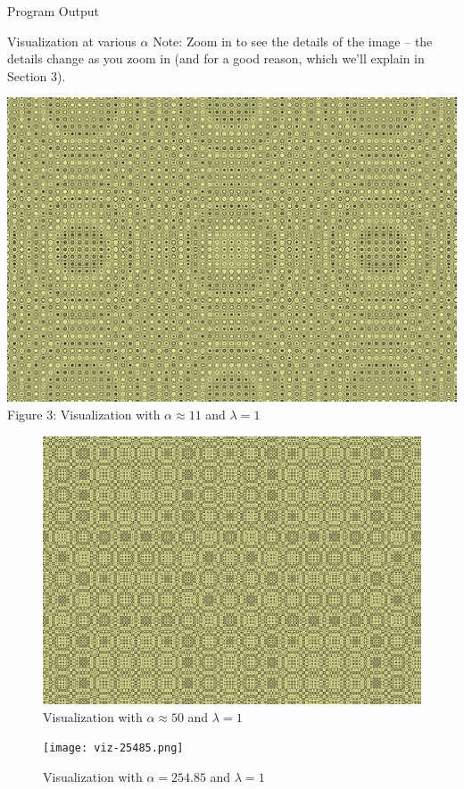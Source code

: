 \documentclass[11pt]{article}
\begin{document}
\begin{section}{Program Output}
\begin{subsection}{Visualization at various $\alpha$}
Note: Zoom in to see the details of the image -- the details change as you zoom in (and for a good reason, which we'll explain in Section 3).
\begin{center}
\includegraphics[width=.9\textwidth]{viz-11.png}\\
Figure 3: Visualization with $\alpha \approx 11$ and $\lambda = 1$
\label{fig:viz11}
\end{center}
\begin{figure}[h]
\centering
\includegraphics[width=.9\textwidth]{viz-50.png}
\caption{Visualization with $\alpha \approx 50$ and $\lambda = 1$}
\label{fig:viz50}
\end{figure}
\begin{figure}[h]
\centering
\texttt{[image: viz-25485.png]}
\caption{Visualization with $\alpha = 254.85$ and $\lambda = 1$}
\label{fig:viz25485}
\end{figure}


\end{subsection}
\end{section}
\end{document}
